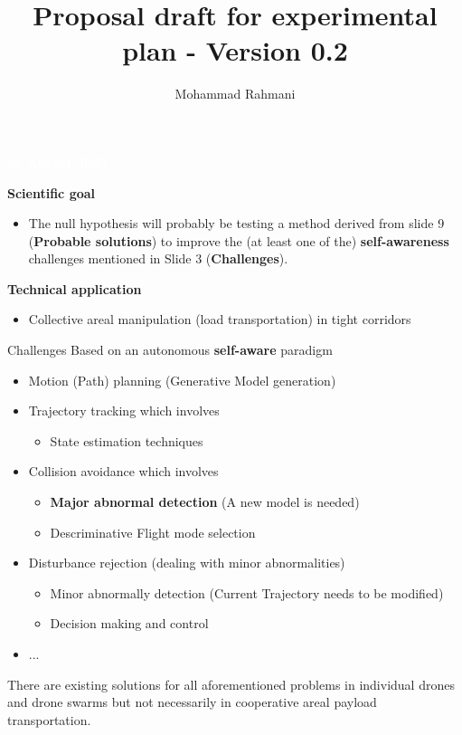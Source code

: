 \documentclass[unknownkeysallowed]{beamer}
\title{Proposal draft for experimental plan - Version 0.2}
\author{Mohammad Rahmani}
\institute{DECIDE Doctoral School}
\begin{document}
	\begin{frame}
		\date{}
		\maketitle
		\textcolor{white}{\textbf{26 August 2020}}
	\end{frame}

	\begin{frame}{}
		\textbf{Scientific goal}
		\begin{itemize}
			\item The null hypothesis will probably be testing a method derived from slide 9 (\textbf{Probable solutions}) to improve the (at least one of the) \textbf{self-awareness} challenges mentioned in Slide 3 (\textbf{Challenges}).  
		\end{itemize}
		
		
		\textbf{Technical application}
		\begin{itemize}
			\item Collective areal manipulation (load transportation) in tight corridors
		\end{itemize}
		
	\end{frame}

	\begin{frame}{Challenges}
		Based on an autonomous \textbf{self-aware} paradigm
		\begin{itemize}
			\item Motion (Path) planning (Generative Model generation)
			\item Trajectory tracking which involves
				\begin{itemize}
					\item State estimation techniques
				\end{itemize}
			\item Collision avoidance which involves
				\begin{itemize}
					\item \textbf{Major abnormal detection} (A new model is needed)
					\item Descriminative Flight mode selection
				\end{itemize}
			\item Disturbance rejection (dealing with minor abnormalities)
				\begin{itemize}
					\item Minor abnormally detection (Current Trajectory needs to be modified)
					\item Decision making and control 
				\end{itemize}
			\item ...
		\end{itemize}
		There are existing solutions for all aforementioned problems in individual drones and drone swarms but not necessarily in cooperative areal payload transportation. 
	\end{frame}
\end{document}
